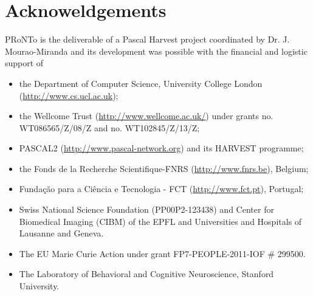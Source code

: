 \section{Acknoweldgements}
PRoNTo is the deliverable of a Pascal Harvest project coordinated by Dr. J. Mourao-Miranda and its development was possible with the financial and logistic support of 
\begin{itemize}
\item the Department of Computer Science, University College London  (\url{http://www.cs.ucl.ac.uk});
\item the Wellcome Trust (\url{http://www.wellcome.ac.uk/}) under grants no. WT086565/Z/08/Z and no. WT102845/Z/13/Z;
\item PASCAL2 (\url{http://www.pascal-network.org}) and its HARVEST programme;
\item the Fonds de la Recherche Scientifique-FNRS (\url{http://www.fnrs.be}), Belgium;
\item Funda\c{c}\~{a}o para a Ci\^{e}ncia e Tecnologia - FCT (\url{http://www.fct.pt}), Portugal;
\item Swiss National Science Foundation (PP00P2-123438) and Center for   Biomedical Imaging (CIBM) of the EPFL and Universities and Hospitals  of Lausanne and Geneva.
\item The EU Marie Curie Action under grant FP7-PEOPLE-2011-IOF \# 299500.
\item The Laboratory of Behavioral and Cognitive Neuroscience, Stanford University.
\end{itemize}

